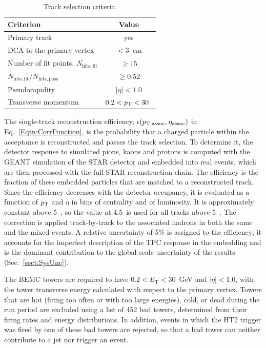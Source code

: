 \begin{table}[!htbp]
	\caption[Track selection criteria]{Track selection criteria.}
	\label{Tab:JHTrackCuts}
	\centering
	\begin{tabular}{l | c}
		\hline
		Criterion & Value \Tstrut \Bstrut \\
		\hline
		Primary track & yes \\
		DCA to the primary vertex & $< 3$~cm \\
		Number of fit points, $N_\mathrm{hits,fit}$ & $\geq 15$ \\
		$N_\mathrm{hits,fit}/N_\mathrm{hits,poss}$ & $\geq 0.52$ \\
		Pseudorapidity & $|\eta| < 1.0$ \\
		Transverse momentum & $0.2 < \ensuremath{p_{\rm T}}\xspace < 30$~\GeVc \\
		\hline
	\end{tabular}
\end{table}

The single-track reconstruction efficiency, $\epsilon(p_{\mathrm{T, assoc}}, \eta_{\rm assoc})$ in Eq.~\ref{Eqtn:CorrFunction}, is the probability that a charged particle within the acceptance is reconstructed and passes the track selection.
%
To determine it, the detector response to simulated pions, kaons and protons is computed with the GEANT simulation of the STAR detector and embedded into real \AuAu events, which are then processed with the full STAR reconstruction chain.
%
The efficiency is the fraction of these embedded particles that are matched to a reconstructed track.
%
Since the efficiency decreases with the detector occupancy, it is evaluated as a function of \ensuremath{p_{\rm T}}\xspace and $\eta$ in bins of centrality and of luminosity.
%
It is approximately constant above 5~\GeVc, so the value at 4.5~\GeVc is used for all tracks above 5~\GeVc.
%
The correction is applied track-by-track to the associated hadrons in both the same and the mixed events.
%
A relative uncertainty of 5\% is assigned to the efficiency; it accounts for the imperfect description of the TPC response in the embedding and is the dominant contribution to the global scale uncertainty of the results (Sec.~\ref{sect:SysUnc}).

The BEMC towers are required to have $0.2 < E_\mathrm{T} < 30$~GeV and $|\eta| < 1.0$, with the tower transverse energy calculated with respect to the primary vertex.
%
Towers that are hot (firing too often or with too large energies), cold, or dead during the run period are excluded using a list of 452 bad towers, determined from their firing rates and energy distributions.
%
In addition, events in which the HT2 trigger was fired by one of these bad towers are rejected, so that a bad tower can neither contribute to a jet nor trigger an event.

